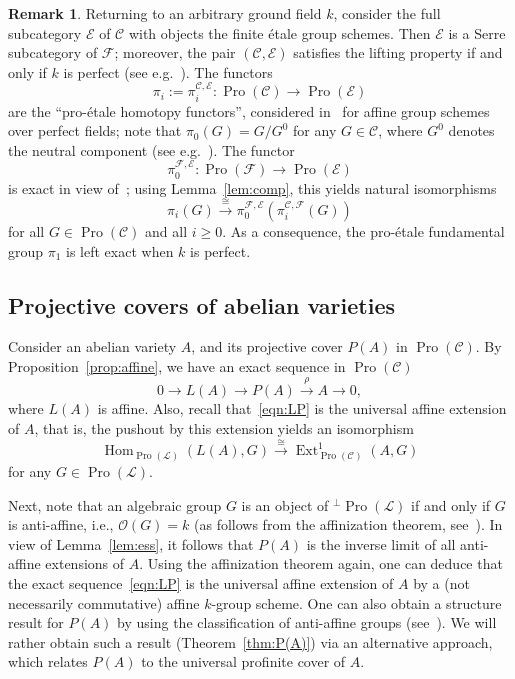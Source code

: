 \documentclass[11pt]{article}
\theoremstyle{definition}
\newtheorem{rema}[theo]{Remark}
\numberwithin{equation}{section}
\newcommand\cC{{\mathcal C}}
\newcommand\cE{{\mathcal E}}
\newcommand\cF{{\mathcal F}}
\newcommand\cL{{\mathcal L}}
\newcommand\cO{{\mathcal O}}
\DeclareMathOperator{\Ext}{Ext}
\DeclareMathOperator{\Hom}{Hom}
\DeclareMathOperator{\Pro}{Pro}
\theoremstyle{remark}
\begin{document}
\begin{rema}\label{rem:profinite}
Returning to an arbitrary ground field $k$, consider the full subcategory $\cE$ of $\cC$ with objects the finite \'etale group schemes. Then $\cE$ is a Serre subcategory of $\cF$; moreover, the pair $(\cC,\cE)$ satisfies the lifting property if and only if $k$ is perfect (see e.g.~\cite[Thm.~1.1, Rem.~3.3]{Br15}). The functors
\[
\pi_i := \pi_i^{\cC,\cE} :
\Pro(\cC) \longrightarrow \Pro(\cE)
\]
are the ``pro-\'etale homotopy functors'', considered in~\cite[V.3.4.1]{DG} for affine group schemes over perfect fields; note that $\pi_0(G) = G/G^0$ for any $G \in \cC$, where $G^0$ denotes the neutral component (see e.g.~\cite[II.5.1]{DG}). The functor
\[
\pi_0^{\cF,\cE} : \Pro(\cF) \to \Pro(\cE)
\]
is exact in view of~\cite[V.3.1.5]{DG}; using Lemma~\ref{lem:comp}, this yields natural isomorphisms
\[
\pi_i(G) \stackrel{\cong}{\longrightarrow}
\pi_0^{\cF,\cE}(\pi_i^{\cC,\cF}(G))
\]
for all $G \in \Pro(\cC)$ and all $i \geq 0$. As a consequence, the pro-\'etale fundamental group $\pi_1$ is left exact when $k$ is perfect.
\end{rema}

\subsection{Projective covers of abelian varieties}\label{subsec:P(A)}

Consider an abelian variety $A$, and its projective cover $P(A)$ in $\Pro(\cC)$. By Proposition~\ref{prop:affine}, we have an exact sequence in $\Pro(\cC)$
\begin{equation}\label{eqn:LP}
0 \longrightarrow L(A) \longrightarrow P(A)
\stackrel{\rho}{\longrightarrow} A \longrightarrow 0,
\end{equation}
where $L(A)$ is affine. Also, recall that~\eqref{eqn:LP} is the universal affine extension of $A$, that is, the pushout by this extension yields an isomorphism
\begin{equation}\label{eqn:univCL}
\Hom_{\Pro(\cL)}(L(A),G)
\stackrel{\cong}{\longrightarrow}
\Ext^1_{\Pro(\cC)}(A,G)
\end{equation}
for any $G \in \Pro(\cL)$.

Next, note that an algebraic group $G$ is an object of ${^{\perp} \Pro(\cL)}$ if and only if $G$ is anti-affine, i.e., $\cO(G) = k$ (as follows from the affinization theorem, see~\cite[III.3.8.2]{DG}). In view of Lemma~\ref{lem:ess}, it follows that $P(A)$ is the inverse limit of all anti-affine extensions of $A$. Using the affinization theorem again, one can deduce that the exact sequence~\eqref{eqn:LP} is the universal affine extension of $A$ by a (not necessarily commutative) affine $k$-group scheme. One can also obtain a structure result for $P(A)$ by using the classification of anti-affine groups (see~\cite[Thm.~2.7]{Br09}). We will rather obtain such a result (Theorem~\ref{thm:P(A)}) via an alternative approach, which relates $P(A)$ to the universal profinite cover of $A$.
\end{document}
